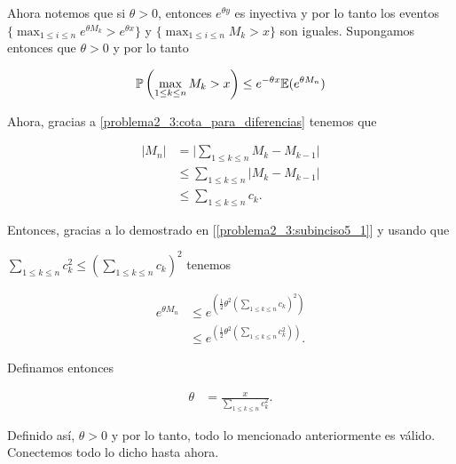 Ahora notemos que si $\theta > 0$, entonces $e^{\theta y}$ es inyectiva y por lo tanto los eventos
$\{ \max_{1 \leq i \leq n} e^{\theta M_k} > e^{\theta x} \}$ y $\{ \max_{1 \leq i \leq n} M_k > x \}$ son iguales.
Supongamos entonces que $\theta > 0$ y por lo tanto

\begin{align}
    \mathbb{P}\left( \max_{1 \leq k \leq n} M_k > x \right) \leq e^{- \theta x} \mathbb{E}(e^{\theta M_n})
\end{align}\par\null

Ahora, gracias a \eqref{problema2_3:cota_para_diferencias} tenemos que

\begin{align}
        |M_n|   &=      \bigg| \sum_{1 \leq k \leq n} M_k - M_{k-1} \bigg|       \\
                &\leq   \sum_{1 \leq k \leq n} \bigg| M_k - M_{k-1} \bigg|       \\
                &\leq   \sum_{1 \leq k \leq n} c_k.                               
\end{align}

Entonces, gracias a lo demostrado en [\ref{problema2_3:subinciso5_1}] y usando que \par$\sum_{1 \leq k \leq n} c_k^2 \leq (\sum_{1 \leq k \leq n} c_k)^2$ tenemos

\begin{align}
    e^{\theta M_n}  &\leq   e^{\left( \frac{1}{2} \theta^2 \left( \sum_{1 \leq k \leq n} c_k \right)^2\right)}  \\
                    &\leq   e^{\left( \frac{1}{2} \theta^2 \left( \sum_{1 \leq k \leq n} c_k^2 \right)\right)}.
\end{align}\par\null

Definamos entonces

\begin{align}
    \theta &= \frac{x}{\sum_{1 \leq k \leq n} c_k^2}.
\end{align}\par\null

Definido así, $\theta > 0$ y por lo tanto, todo lo mencionado anteriormente es válido. Conectemos todo lo dicho hasta ahora.\par\null

